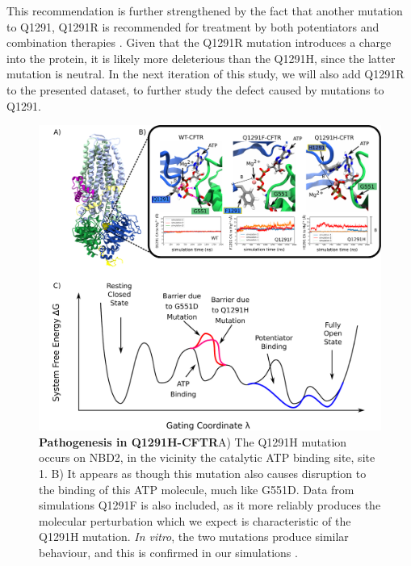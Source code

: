 This recommendation is further strengthened by the fact that another mutation to Q1291, Q1291R is recommended for treatment by both potentiators and combination therapies \cite{trikafta_website, trikafta_FDA_info, kalydeco_FDA_approval}. Given that the Q1291R mutation introduces a charge into the protein, it is likely more deleterious than the Q1291H, since the latter mutation is neutral. In the next iteration of this study, we will also add Q1291R to the presented dataset, to further study the defect caused by mutations to Q1291. 


\begin{figure}
	\begin{center}
		\includegraphics[width=\textwidth]{figures/perspective/Q1291.pdf}
	\end{center}
	\captionsetup{singlelinecheck = false, justification=raggedright}
	\caption[Pathogenesis in Q1291H-CFTR]{\textbf{Pathogenesis in Q1291H-CFTR}{A) The Q1291H mutation occurs on NBD2, in the vicinity the catalytic ATP binding site, site 1. B) It appears as though this mutation also causes disruption to the binding of this ATP molecule, much like G551D. Data from simulations Q1291F is also included, as it more reliably produces the molecular perturbation which we expect is characteristic of the Q1291H mutation. \textit{In vitro}, the two mutations produce similar behaviour, and this is confirmed in our simulations \cite{dong2015}. }}

	\label{Q1291H_results}

\end{figure}


